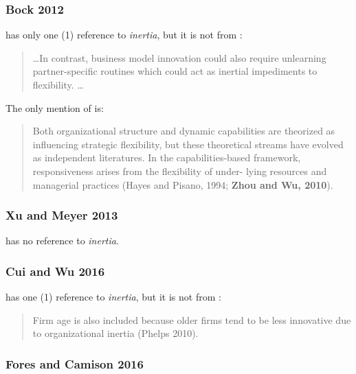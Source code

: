 \subsubsection{Bock 2012}

\cite{bock2012effects} has only one (1) reference to \textit{inertia}, but it is not from \cite{zhou2010technological}: \\
\begin{quotation}
\ldots In contrast,
business model innovation could also require unlearning partner-specific routines which
could act as inertial impediments to flexibility. \ldots
\end{quotation}

The only mention of \cite{zhou2010technological} is: \\
\begin{quotation}
	Both organizational structure and dynamic capabilities are theorized as influencing
	strategic flexibility, but these theoretical streams have evolved as independent literatures.
	In the capabilities-based framework, responsiveness arises from the flexibility of under-
	lying resources and managerial practices (Hayes and Pisano, 1994; \textbf{Zhou and Wu, 2010}).\textellipsis
\end{quotation}

\subsubsection{Xu and Meyer 2013}

\cite{xu2013linking} has no reference to \textit{inertia}. \\

\subsubsection{Cui and Wu 2016}

\cite{cui2016utilizing} has one (1) reference to \textit{inertia}, but it is not from \cite{zhou2010technological}: \\
\begin{quotation}
Firm age is also included because older firms tend to be
less innovative due to organizational inertia (Phelps 2010).
\end{quotation}

\subsubsection{Fores and Camison 2016}

